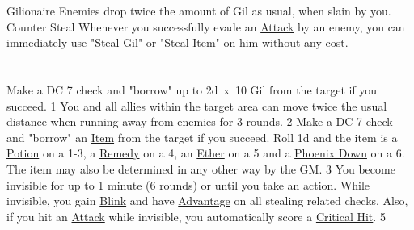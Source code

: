 {Gilionaire}
{	
	Enemies drop twice the amount of Gil as usual, when slain by you.
}
{Counter Steal}
{	
	Whenever you successfully evade an \hyperlink{action}{Attack} by an enemy, you can immediately use "Steal Gil" or "Steal Item" on him without any cost.
}
\pagebreak \\
\\\\
{
	Make a DC 7 check and "borrow" up to 2d~x~10 Gil from the target if you succeed. 
}{}{1}
{
	You and all allies within the target area can move twice the usual distance when running away from enemies for 3 rounds.
}{}{2}
{
	Make a DC 7 check and "borrow" an \hyperlink{item}{Item} from the target if you succeed. 
	Roll 1d and the item is a \hyperlink{item}{Potion} on a 1-3, a \hyperlink{item}{Remedy} on a 4, an \hyperlink{item}{Ether} on a 5 and a \hyperlink{item}{Phoenix Down} on a 6. 
	The item may also be determined in any other way by the GM.
}{}{3}
{
	You become invisible for up to 1 minute (6 rounds) or until you take an action.
	While invisible, you gain \hyperlink{status}{Blink} and have \hyperlink{check}{Advantage} on all stealing related checks. Also, if you hit an \hyperlink{action}{Attack} while invisible, you automatically score a \hyperlink{action}{Critical Hit}.
}{\blink}{5}
\pagebreak
